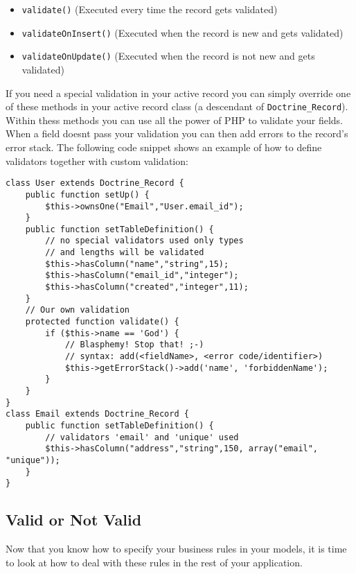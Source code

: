 \documentclass[11pt,a4paper]{report}
\begin{document}
\begin{itemize}
\item{\texttt{validate()} (Executed every time the record gets validated)}
\item{\texttt{validateOnInsert()} (Executed when the record is new and gets validated)}
\item{\texttt{validateOnUpdate()} (Executed when the record is not new and gets validated)}
\end{itemize}
If you need a special validation in your active record you can simply override one of these methods in your active record class (a descendant of \texttt{Doctrine\_Record}). Within thess methods you can use all the power of PHP to validate your fields. When a field doesnt pass your validation you can then add errors to the record's error stack. The following code snippet shows an example of how to define validators together with custom validation:

\begin{verbatim}
class User extends Doctrine_Record {
    public function setUp() {
        $this->ownsOne("Email","User.email_id");
    }
    public function setTableDefinition() {
        // no special validators used only types
        // and lengths will be validated
        $this->hasColumn("name","string",15);
        $this->hasColumn("email_id","integer");
        $this->hasColumn("created","integer",11);
    }
    // Our own validation
    protected function validate() {
        if ($this->name == 'God') {
            // Blasphemy! Stop that! ;-)
            // syntax: add(<fieldName>, <error code/identifier>)
            $this->getErrorStack()->add('name', 'forbiddenName');
        }
    }
}
class Email extends Doctrine_Record {
    public function setTableDefinition() {
        // validators 'email' and 'unique' used
        $this->hasColumn("address","string",150, array("email", "unique"));
    }
}
\end{verbatim}

\subsection{Valid or Not Valid}
Now that you know how to specify your business rules in your models, it is time to look at how to deal with these rules in the rest of your application.
\end{document}
